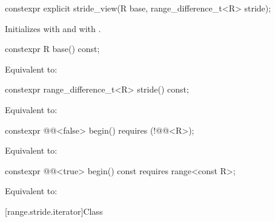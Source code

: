 \setcounter{Paras}{0}

\begin{itemdecl}
constexpr explicit stride_view(R base, range_difference_t<R> stride);
\end{itemdecl}
\begin{itemdescr}
\pnum
\effects Initializes  with  and  with .
\end{itemdescr}

\begin{itemdecl}
constexpr R base() const;
\end{itemdecl}
\begin{itemdescr}
\pnum
\effects Equivalent to: 
\end{itemdescr}

\begin{itemdecl}
constexpr range_difference_t<R> stride() const;
\end{itemdecl}
\begin{itemdescr}
\pnum
\effects Equivalent to: 
\end{itemdescr}

\begin{itemdecl}
constexpr @@<false> begin() requires (!@@<R>);
\end{itemdecl}
\begin{itemdescr}
\pnum
\effects Equivalent to: 
\end{itemdescr}

\begin{itemdecl}
constexpr @@<true> begin() const requires range<const R>;
\end{itemdecl}
\begin{itemdescr}
\pnum
\effects Equivalent to: 
\end{itemdescr}

[range.stride.iterator]{Class }

